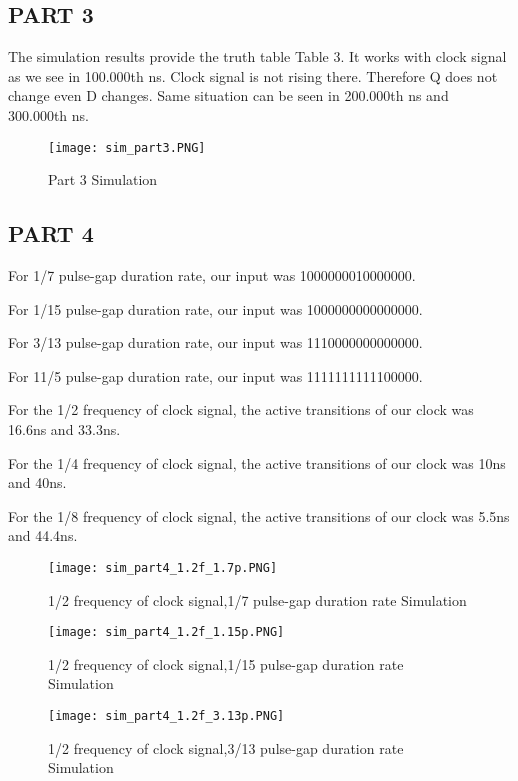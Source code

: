 \documentclass[pdftex,12pt,a4paper]{article}
\begin{document}
\subsection{PART 3}
The simulation results provide the truth table Table 3. It works with clock signal as we see in 100.000th ns. Clock signal is not rising there. Therefore Q does not change even D changes. Same situation can be seen in 200.000th ns and 300.000th ns.

\begin{figure}[ht]
	\centering
	\texttt{[image: sim\_part3.PNG]}	
	\caption{Part 3 Simulation}
	\label{fig10}
\end{figure}

\clearpage




\subsection{PART 4}
For 1/7 pulse-gap duration rate, our input was 1000000010000000.

For 1/15 pulse-gap duration rate, our input was 1000000000000000.

For 3/13 pulse-gap duration rate, our input was 1110000000000000.

For 11/5 pulse-gap duration rate, our input was 1111111111100000.

For the 1/2 frequency of clock signal, the active transitions of our clock was 16.6ns and 33.3ns.

For the 1/4 frequency of clock signal, the active transitions of our clock was 10ns and 40ns.

For the 1/8 frequency of clock signal, the active transitions of our clock was 5.5ns and 44.4ns.

\begin{figure}[ht]
	\centering
	\texttt{[image: sim\_part4\_1.2f\_1.7p.PNG]}	
	\caption{1/2 frequency of clock signal,1/7 pulse-gap duration rate Simulation}
	\label{fig11}
\end{figure}

\begin{figure}[ht]
	\centering
	\texttt{[image: sim\_part4\_1.2f\_1.15p.PNG]}	
	\caption{1/2 frequency of clock signal,1/15 pulse-gap duration rate Simulation}
	\label{fig12}
\end{figure}

\begin{figure}[ht]
	\centering
	\texttt{[image: sim\_part4\_1.2f\_3.13p.PNG]}	
	\caption{1/2 frequency of clock signal,3/13 pulse-gap duration rate Simulation}
	\label{fig13}
\end{figure}
\end{document}
